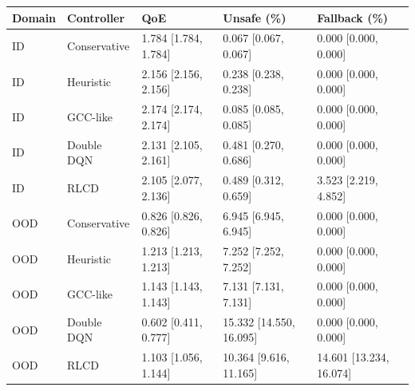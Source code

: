 \begin{tabular}{lllll}
\toprule
Domain & Controller & QoE & Unsafe (\%) & Fallback (\%) \\
\midrule
ID & Conservative & 1.784 [1.784, 1.784] & 0.067 [0.067, 0.067] & 0.000 [0.000, 0.000] \\
ID & Heuristic & 2.156 [2.156, 2.156] & 0.238 [0.238, 0.238] & 0.000 [0.000, 0.000] \\
ID & GCC-like & 2.174 [2.174, 2.174] & 0.085 [0.085, 0.085] & 0.000 [0.000, 0.000] \\
ID & Double DQN & 2.131 [2.105, 2.161] & 0.481 [0.270, 0.686] & 0.000 [0.000, 0.000] \\
ID & RLCD & 2.105 [2.077, 2.136] & 0.489 [0.312, 0.659] & 3.523 [2.219, 4.852] \\
OOD & Conservative & 0.826 [0.826, 0.826] & 6.945 [6.945, 6.945] & 0.000 [0.000, 0.000] \\
OOD & Heuristic & 1.213 [1.213, 1.213] & 7.252 [7.252, 7.252] & 0.000 [0.000, 0.000] \\
OOD & GCC-like & 1.143 [1.143, 1.143] & 7.131 [7.131, 7.131] & 0.000 [0.000, 0.000] \\
OOD & Double DQN & 0.602 [0.411, 0.777] & 15.332 [14.550, 16.095] & 0.000 [0.000, 0.000] \\
OOD & RLCD & 1.103 [1.056, 1.144] & 10.364 [9.616, 11.165] & 14.601 [13.234, 16.074] \\
\bottomrule
\end{tabular}
